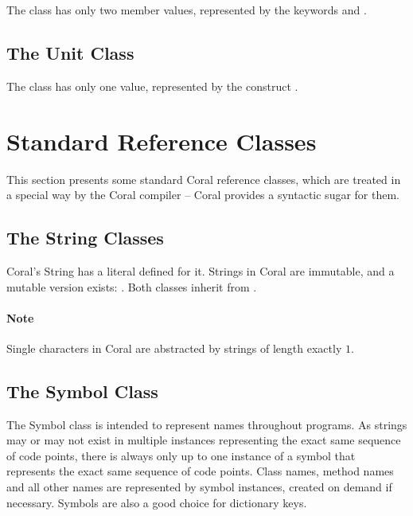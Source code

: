 The  class has only two member values, represented by the keywords  and . 





\subsection{The Unit Class}

The  class has only one value, represented by the construct \code{()}. 





\section{Standard Reference Classes}

This section presents some standard Coral reference classes, which are treated in a special way by the Coral compiler -- Coral provides a syntactic sugar for them. 




\subsection{The String Classes}

Coral's String has a literal defined for it. Strings in Coral are immutable, and a mutable version exists: . Both classes inherit from . 

\paragraph{Note}
Single characters in Coral are abstracted by strings of length exactly $1$. 

\subsection{The Symbol Class}


The Symbol class is intended to represent names throughout programs. As strings may or may not exist in multiple instances representing the exact same sequence of code points, there is always only up to one instance of a symbol that represents the exact same sequence of code points. Class names, method names and all other names are represented by symbol instances, created on demand if necessary. Symbols are also a good choice for dictionary keys. 





